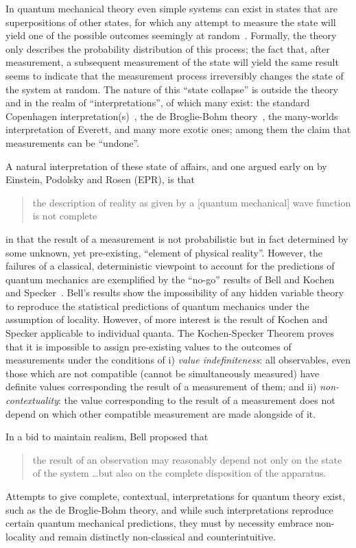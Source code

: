 \documentclass[10pt]{article}
\begin{document}
In quantum mechanical theory even simple systems can exist in states that are superpositions of other states, for which any attempt to measure the state will yield one of the possible outcomes seemingly at random~\cite{zeil-99}.
Formally, the theory only describes the probability distribution of this process;
the fact that, after measurement, a subsequent measurement of the state will yield the same result seems to indicate that the measurement process irreversibly changes the state of the system at random.
The nature of this ``state collapse'' is outside the theory and in the realm of ``interpretations'', of which many exist:
the standard Copenhagen interpretation(s)~\cite{wheeler-Zurek:83}, the de Broglie-Bohm theory~\cite{bohm52}, the many-worlds interpretation of Everett, and many more exotic ones; among them
the claim that measurements can be ``undone''.

A natural interpretation of these state of affairs, and one argued early on by Einstein, Podolsky and Rosen (EPR), is that
\begin{quote}
	the description of reality as given by a [quantum mechanical] wave function is not complete
\end{quote}
in that the result of a measurement is not probabilistic but in fact determined by some unknown, yet pre-existing, ``element of physical reality''.
However, the failures of a classical, deterministic viewpoint to account for the predictions of quantum mechanics are exemplified by the ``no-go'' results of Bell \cite{bell} and Kochen and Specker~\cite{kochen1}.
Bell's results show the impossibility of any hidden variable theory to reproduce the statistical predictions of quantum mechanics under the assumption of locality.
However, of more interest  is the result of Kochen and Specker applicable to individual quanta.
The Kochen-Specker Theorem proves that it is impossible to assign pre-existing values to the outcomes of measurements under the conditions of i)  \emph{value indefiniteness}: all observables, even those which are not compatible (cannot be simultaneously measured) have definite values corresponding the result of a measurement of them; and  ii) \emph{non-contextuality}: the value corresponding to the result of a measurement does not depend on which other compatible measurement are made alongside of it.

In a  bid to maintain realism, Bell proposed that~\cite{bell-66}
\begin{quote}
	the result of an observation may reasonably depend not only on the state of the system \dots but also on the complete disposition of the apparatus.
\end{quote}
Attempts to give complete, contextual, interpretations for quantum theory exist, such as the de Broglie-Bohm theory, and while such interpretations reproduce certain quantum mechanical predictions, they must by necessity embrace non-locality and remain distinctly non-classical and counterintuitive.
\end{document}
